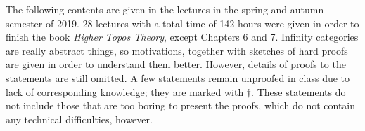 The following contents are given in the lectures in the spring and autumn semester of 2019. 28 lectures with a total time of 142 hours 
were given in order to finish the book \textit{Higher Topos Theory}, except Chapters 6 and 7. Infinity categories are
really abstract things, so motivations, together with sketches of hard proofs are given in order to understand them better. 
However, details of proofs to the statements are still omitted. A few statements 
remain unproofed in class due to lack of corresponding knowledge; they are marked with $\dagger$. These statements do not include 
those that are too boring to present the proofs, which do not contain any technical difficulties, however. 